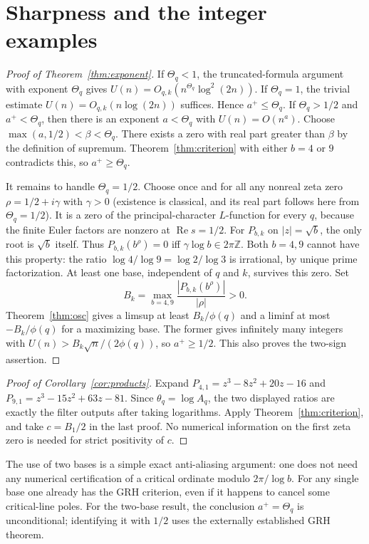 \documentclass[11pt]{article}
\theoremstyle{definition}\newtheorem{definition}[theorem]{Definition}
\newcommand{\Rea}{\operatorname{Re}}
\newcommand{\thq}{\theta_q}
\begin{document}
\section{Sharpness and the integer examples}
\begin{proof}[Proof of Theorem~\ref{thm:exponent}]
If $\Theta_q<1$, the truncated-formula argument with exponent $\Theta_q$ gives $U(n)=O_{q,k}(n^{\Theta_q}\log^2(2n))$. If $\Theta_q=1$, the trivial estimate $U(n)=O_{q,k}(n\log(2n))$ suffices. Hence $a^+\le\Theta_q$. If $\Theta_q>1/2$ and $a^+<\Theta_q$, then there is an exponent $a<\Theta_q$ with $U(n)=O(n^a)$. Choose $\max(a,1/2)<\beta<\Theta_q$. There exists a zero with real part greater than $\beta$ by the definition of supremum. Theorem~\ref{thm:criterion} with either $b=4$ or $9$ contradicts this, so $a^+\ge\Theta_q$.

It remains to handle $\Theta_q=1/2$. Choose once and for all any nonreal zeta zero $\rho=1/2+i\gamma$ with $\gamma>0$ (existence is classical, and its real part follows here from $\Theta_q=1/2$). It is a zero of the principal-character $L$-function for every $q$, because the finite Euler factors are nonzero at $\Rea s=1/2$. For $P_{b,k}$ on $|z|=\sqrt b$, the only root is $\sqrt b$ itself. Thus $P_{b,k}(b^\rho)=0$ iff $\gamma\log b\in2\pi\mathbb Z$. Both $b=4,9$ cannot have this property: the ratio $\log4/\log9=\log2/\log3$ is irrational, by unique prime factorization. At least one base, independent of $q$ and $k$, survives this zero. Set
\[
 B_k=\max_{b=4,9}\frac{|P_{b,k}(b^\rho)|}{|\rho|}>0.
\]
Theorem~\ref{thm:osc} gives a limsup at least $B_k/\phi(q)$ and a liminf at most $-B_k/\phi(q)$ for a maximizing base. The former gives infinitely many integers with $U(n)>B_k\sqrt n/(2\phi(q))$, so $a^+\ge1/2$. This also proves the two-sign assertion.
\end{proof}
\begin{proof}[Proof of Corollary~\ref{cor:products}]
Expand $P_{4,1}=z^3-8z^2+20z-16$ and $P_{9,1}=z^3-15z^2+63z-81$. Since $\thq=\log A_q$, the two displayed ratios are exactly the filter outputs after taking logarithms. Apply Theorem~\ref{thm:criterion}, and take $c=B_1/2$ in the last proof. No numerical information on the first zeta zero is needed for strict positivity of $c$.
\end{proof}
The use of two bases is a simple exact anti-aliasing argument: one does not need any numerical certification of a critical ordinate modulo $2\pi/\log b$. For any single base one already has the GRH criterion, even if it happens to cancel some critical-line poles. For the two-base result, the conclusion $a^+=\Theta_q$ is unconditional; identifying it with $1/2$ uses the externally established GRH theorem.
\end{document}
